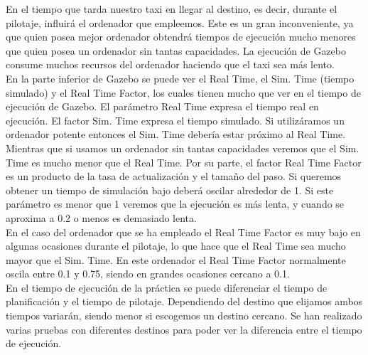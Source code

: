En el tiempo que tarda nuestro taxi en llegar al destino, es decir, durante el pilotaje, influirá el ordenador que empleemos. Este es un gran inconveniente, ya que quien posea mejor ordenador obtendrá tiempos de ejecución mucho menores que quien posea un ordenador sin tantas capacidades. La ejecución de Gazebo consume muchos recursos del ordenador haciendo que el taxi sea más lento. \\

En la parte inferior de Gazebo se puede ver el Real Time, el Sim. Time (tiempo simulado) y el Real Time Factor, los cuales tienen mucho que ver en el tiempo de ejecución de Gazebo. El parámetro Real Time expresa el tiempo real en ejecución. El factor Sim. Time expresa el tiempo simulado. Si utilizáramos un ordenador potente entonces el Sim. Time debería estar próximo al Real Time. Mientras que si usamos un ordenador sin tantas capacidades veremos que el Sim. Time es mucho menor que el Real Time. Por su parte, el factor Real Time Factor es un producto de la tasa de actualización y el tamaño del paso. Si queremos obtener un tiempo de simulación bajo deberá oscilar alrededor de 1. Si este parámetro es menor que 1 veremos que la ejecución es más lenta, y cuando se aproxima a 0.2 o menos es demasiado lenta.\\

En el caso del ordenador que se ha empleado el Real Time Factor es muy bajo en algunas ocasiones durante el pilotaje, lo que hace que el Real Time sea mucho mayor que el Sim. Time. En este ordenador el Real Time Factor normalmente oscila entre 0.1 y 0.75, siendo en grandes ocasiones cercano a 0.1. \\

En el tiempo de ejecución de la práctica se puede diferenciar el tiempo de planificación y el tiempo de pilotaje. Dependiendo del destino que elijamos ambos tiempos variarán, siendo menor si escogemos un destino cercano. Se han realizado varias pruebas con diferentes destinos para poder ver la diferencia entre el tiempo de ejecución.

